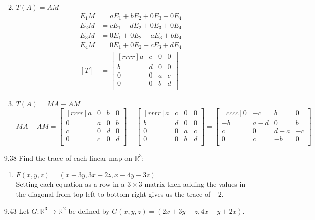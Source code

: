 \documentclass[12pt]{article}
\theoremstyle{definition}
\theoremstyle{plain}
\begin{document}
\begin{enumerate}
\begin{enumerate}
\begin{align*}
		\end{align*}
	\item $T(A)=AM$
		\begin{align*}
		E_1M&= aE_1+bE_2+0E_3+0E_4\\
		E_2M&= cE_1+dE_2+0E_3+0E_4\\
		E_3M&= 0E_1+0E_2+aE_3+bE_4\\
		E_4M&= 0E_1+0E_2+cE_3+dE_4\\
		[T]&=\begin{bmatrix}[rrrr]a&c&0&0\\b&d&0&0\\0&0&a&c\\0&0&b&d\\\end{bmatrix}
		\end{align*}
	\item $T(A)=MA-AM$
		\[ MA-AM=\begin{bmatrix}[rrrr]a&0&b&0\\0&a&0&b\\c&0&d&0\\0&c&0&d\\\end{bmatrix}-\begin{bmatrix}[rrrr]a&c&0&0\\b&d&0&0\\0&0&a&c\\0&0&b&d\\\end{bmatrix} = \begin{bmatrix}[cccc]0&-c&b&0\\-b&a-d&0&b\\c&0&d-a&-c\\0&c&-b&0\\\end{bmatrix} \]
	\end{enumerate}
\item[9.38]Find the trace of each linear map on $\mathbb{R}^3$:
	\begin{enumerate}
	\item $F(x,y,z)=(x+3y,3x-2z,x-4y-3z)$\\
		Setting each equation as a row in a $3\times 3$ matrix then adding the values in the diagonal from top left to bottom right gives us the trace of $-2$.
	\end{enumerate}
\pagebreak
\item[9.43]Let $G:\mathbb{R}^3\rightarrow\mathbb{R}^2$ be defined by $G(x,y,z)=(2x+3y-z,4x-y+2x)$.
	\begin{enumerate}

\end{enumerate}
\end{enumerate}
\end{document}
